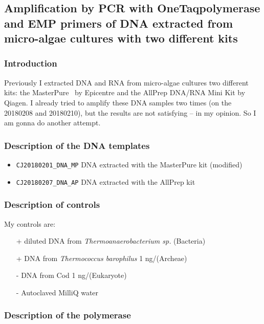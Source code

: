 \subsection{Amplification by PCR with OneTaq\cR polymerase and EMP primers of DNA extracted from micro-algae cultures with two different kits}
\label{task:20180211_cj0}

\subsubsection{Introduction}
Previously I extracted DNA and RNA from micro-algae cultures two different kits: the MasterPure\texttrademark~ by Epicentre and the AllPrep DNA/RNA Mini Kit by Qiagen. I already tried to amplify these DNA samples two times (on the 20180208 and 20180210), but the results are not satisfying -- in my opinion. So I am gonna do another attempt.

\subsubsection{Description of the DNA templates}
\begin{itemize}
\item \texttt{CJ20180201\_DNA\_MP} DNA extracted with the MasterPure kit (modified)
\item \texttt{CJ20180207\_DNA\_AP} DNA extracted with the AllPrep kit
\end{itemize}


\subsubsection{Description of controls}
My controls are:
\begin{itemize}
\item[+] diluted DNA from \textit{Thermoanaerobacterium sp.} (Bacteria)
\item[+] DNA from \textit{Thermococcus barophilus} 1 ng/\uL (Archeae)
\item[-] DNA from Cod 1 ng/\uL (Eukaryote)
\item[-] Autoclaved MilliQ water
\end{itemize}


\subsubsection{Description of the polymerase}

